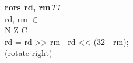 


\begin{instructionblock}{\imagewidth}%
    \textbf{rors rd, rm}\hfill\textit{T1}\\
    rd, rm $\in$ \baseregisters\\
    {N Z C}\\
    rd = rd {>}{>} rm | rd {<}{<} (32 - rm);\\
    (rotate right)
\end{instructionblock}

